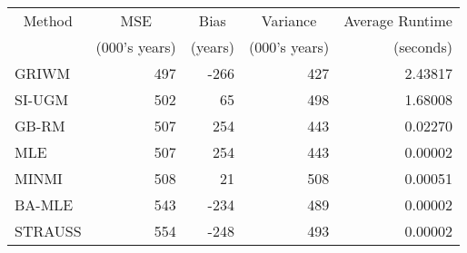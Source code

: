 
\begin{tabular}{lrrrr}
\toprule
\multicolumn{1}{c}{Method} & \multicolumn{1}{c}{MSE} & \multicolumn{1}{c}{Bias} & \multicolumn{1}{c}{Variance} & \multicolumn{1}{c}{Average Runtime} \\
\cmidrule(l{3pt}r{3pt}){1-1} \cmidrule(l{3pt}r{3pt}){2-2} \cmidrule(l{3pt}r{3pt}){3-3} \cmidrule(l{3pt}r{3pt}){4-4} \cmidrule(l{3pt}r{3pt}){5-5}
 & (000's years) & (years) & (000's years) & (seconds)\\
\midrule
GRIWM & 497 & -266 & 427 & 2.43817\\
SI-UGM & 502 & 65 & 498 & 1.68008\\
GB-RM & 507 & 254 & 443 & 0.02270\\
MLE & 507 & 254 & 443 & 0.00002\\
MINMI & 508 & 21 & 508 & 0.00051\\
\addlinespace
BA-MLE & 543 & -234 & 489 & 0.00002\\
STRAUSS & 554 & -248 & 493 & 0.00002\\
\bottomrule
\end{tabular}
